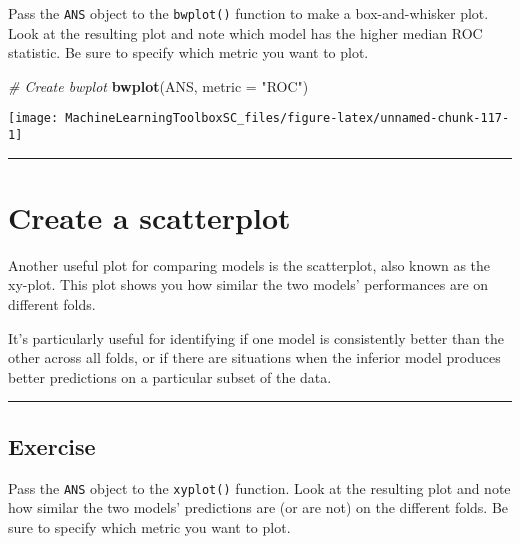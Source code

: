 \documentclass[
]{book}
\newenvironment{Shaded}{\begin{snugshade}}{\end{snugshade}}
\newcommand{\CommentTok}[1]{\textcolor[rgb]{0.56,0.35,0.01}{\textit{#1}}}
\newcommand{\DataTypeTok}[1]{\textcolor[rgb]{0.13,0.29,0.53}{#1}}
\newcommand{\KeywordTok}[1]{\textcolor[rgb]{0.13,0.29,0.53}{\textbf{#1}}}
\newcommand{\NormalTok}[1]{#1}
\newcommand{\StringTok}[1]{\textcolor[rgb]{0.31,0.60,0.02}{#1}}
\begin{document}
Pass the \texttt{ANS} object to the \texttt{bwplot()} function to make a box-and-whisker plot. Look at the resulting plot and note which model has the higher median ROC statistic. Be sure to specify which metric you want to plot.

\begin{Shaded}
\begin{Highlighting}[]
\CommentTok{# Create bwplot}
\KeywordTok{bwplot}\NormalTok{(ANS, }\DataTypeTok{metric =} \StringTok{"ROC"}\NormalTok{)}
\end{Highlighting}
\end{Shaded}

\begin{center}\texttt{[image: MachineLearningToolboxSC\_files/figure-latex/unnamed-chunk-117-1]} \end{center}

\begin{center}\rule{0.5\linewidth}{0.5pt}\end{center}

\hypertarget{create-a-scatterplot}{%
\section{Create a scatterplot}\label{create-a-scatterplot}}

Another useful plot for comparing models is the scatterplot, also known as the xy-plot. This plot shows you how similar the two models' performances are on different folds.

It's particularly useful for identifying if one model is consistently better than the other across all folds, or if there are situations when the inferior model produces better predictions on a particular subset of the data.

\begin{center}\rule{0.5\linewidth}{0.5pt}\end{center}

\hypertarget{exercise-34}{%
\subsection*{Exercise}\label{exercise-34}}

Pass the \texttt{ANS} object to the \texttt{xyplot()} function. Look at the resulting plot and note how similar the two models' predictions are (or are not) on the different folds. Be sure to specify which metric you want to plot.
\end{document}
